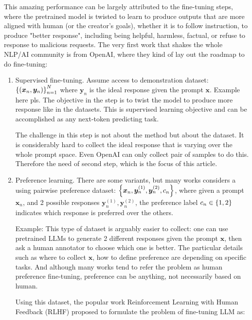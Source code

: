 \documentclass[11pt,a4paper]{article}
\begin{document}
This amazing performance can be largely attributed to the fine-tuning steps, where the pretrained model is twisted to learn to produce outputs that are more aligned with human (or the creator's goals),
whether it is to follow instruction, to produce "better response", including being helpful, harmless, factual, or refuse to response to malicious requests.
The very first work that shakes the whole NLP/AI community is from OpenAI, where they kind of lay out the roadmap to do fine-tuning:
\begin{enumerate}
    \item Supervised fine-tuning. Assume access to demonstration dataset: $\left\{(\bm{x}_n, \bm{y}_n)\right\}_{n=1}^{N}$ where $\bm{y}_n$ is the ideal response given the prompt $\bm{x}$. {\red Example here pls}.
        The objective in the step is to twist the model to produce more response like in the datasets. This is supervised learning objective and can be accomplished as any next-token predicting task.

       The challenge in this step is not about the method but about the dataset. It is considerably hard to collect the ideal response that is varying over the whole prompt space. Even OpenAI can only collect \cite{[x]} pair of samples to do this. Therefore the need of second step, which is the focus of this article.
    \item Preference learning. There are some variants, but many works considers a using pairwise preference dataset: $\left\{\bm{x}_n, \bm{y}_n^{(1)}, \bm{y}_n^{(2)},  c_n\right\}$, where given a prompt $\bm{x}_n$, and 2 possible responses $\bm{y}_n^{(1)}, \bm{y}_n^{(2)}$, the preference label $c_n \in \left\{1,2\right\}$ indicates which response is preferred over the others.

        {\red Example:}
        This type of dataset is arguably easier to collect: one can use pretrained LLMs to generate 2 different responses given the prompt $\bm{x}$, then ask a human annotator to choose which one is better. The particular details such as where to collect $\bm{x}$, how to define preference are depending on specific tasks. And although many works tend to refer the problem as human preference fine-tuning, preference can be anything, not necessarily based on human.

Using this dataset, the popular work Reinforcement Learning with Human Feedback (RLHF) proposed to formulate the problem of fine-tuning LLM as:


\end{enumerate}
\end{document}
